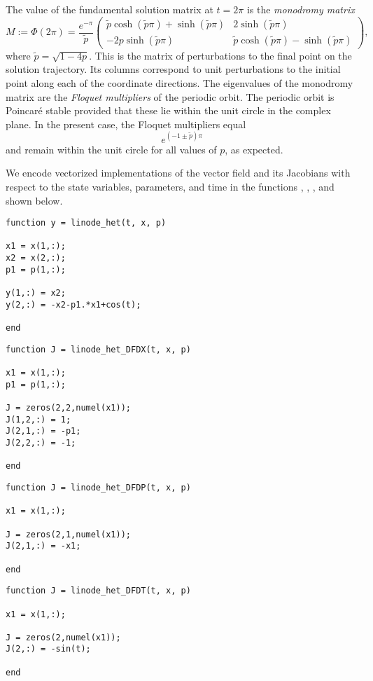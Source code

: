 The value of the fundamental solution matrix at $t=2\pi$ is the \emph{monodromy matrix}
\begin{equation}
M:=\Phi(2\pi)=\frac{e^{-\pi}}{\tilde{p}}\left(\begin{array}{cc}\tilde{p}\cosh(\tilde{p}\pi)+\sinh(\tilde{p}\pi) & 2\sinh(\tilde{p}\pi)\\-2p\sinh(\tilde{p}\pi) & \tilde{p}\cosh(\tilde{p}\pi)-\sinh(\tilde{p}\pi)\end{array}\right),
\end{equation}
where $\tilde{p}=\sqrt{1-4p}$. This is the matrix of perturbations to the final point on the solution trajectory. Its columns correspond to unit perturbations to the initial point along each of the coordinate directions. The eigenvalues of the monodromy matrix are the \emph{Floquet multipliers} of the periodic orbit. The periodic orbit is Poincar\'{e} stable provided that these lie within the unit circle in the complex plane. In the present case, the Floquet multipliers equal
\begin{equation}
e^{(-1\pm\tilde{p})\pi}
\end{equation}
and remain within the unit circle for all values of $p$, as expected.

We encode vectorized implementations of the vector field and its Jacobians with respect to the state variables, parameters, and time in the functions , , , and  shown below.
\begin{lstlisting}[language=coco-highlight]
function y = linode_het(t, x, p)

x1 = x(1,:);
x2 = x(2,:);
p1 = p(1,:);

y(1,:) = x2;
y(2,:) = -x2-p1.*x1+cos(t);

end
\end{lstlisting}
\begin{lstlisting}[language=coco-highlight]
function J = linode_het_DFDX(t, x, p)

x1 = x(1,:);
p1 = p(1,:);

J = zeros(2,2,numel(x1));
J(1,2,:) = 1;
J(2,1,:) = -p1;
J(2,2,:) = -1;

end
\end{lstlisting}
\begin{lstlisting}[language=coco-highlight]
function J = linode_het_DFDP(t, x, p)

x1 = x(1,:);

J = zeros(2,1,numel(x1));
J(2,1,:) = -x1;

end
\end{lstlisting}
\begin{lstlisting}[language=coco-highlight]
function J = linode_het_DFDT(t, x, p)

x1 = x(1,:);

J = zeros(2,numel(x1));
J(2,:) = -sin(t);

end
\end{lstlisting}

